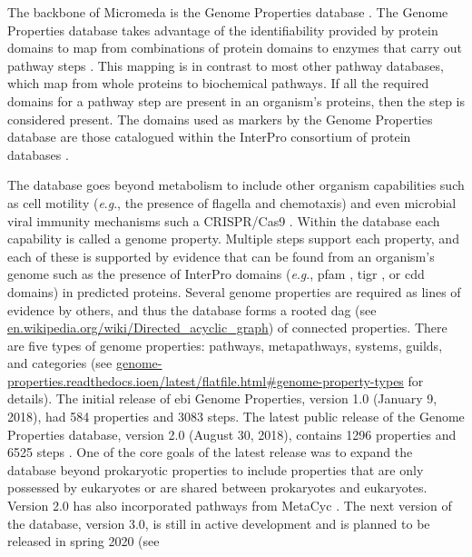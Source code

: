 The backbone of Micromeda is the Genome Properties database \cite{Haft2013}. 
The Genome Properties database takes advantage of the identifiability provided 
by protein domains to map from combinations of protein domains to enzymes that 
carry out pathway steps \cite{richardson2018genome}. This mapping is in 
contrast to most other pathway databases, which map from whole proteins to 
biochemical pathways. If all the required domains for a pathway step are present 
in an organism's proteins, then the step is considered present. The domains used 
as markers by the Genome Properties database are those catalogued within the 
InterPro consortium of protein databases 
\cite{apweiler2000interpro,richardson2018genome}. 

The database goes beyond metabolism to include other organism capabilities such as 
cell motility (\textit{e}.\textit{g}., the presence of flagella and chemotaxis) 
and even microbial viral immunity mechanisms such a CRISPR/Cas9 
\cite{horvath2010crispr}. Within the database each capability is called a genome 
property. Multiple steps support each property, and each of these is supported 
by evidence that can be found from an organism's genome such as the presence of 
InterPro domains (\textit{e}.\textit{g}., \gls{pfam} \cite{bateman2004pfam}, 
\gls{tigr} \cite{haft2001tigrfams}, or \gls{cdd} \cite{marchler2014cdd} domains) 
in predicted proteins. Several genome properties are required as lines of 
evidence by others, and thus the database forms a rooted \gls{dag} (see 
\href{http://en.wikipedia.org/wiki/Directed_acyclic_graph}{en.wikipedia.org/wiki/Directed\_acyclic\_graph}) 
of connected properties. There are five types of genome properties: pathways, 
metapathways, systems, guilds, and categories (see 
\href{http://genome-properties.readthedocs.io/en/latest/flatfile.html#genome-property-types}{genome-properties.readthedocs.ioen/latest/flatfile.html\#genome-property-types} 
for details). The initial release of \gls{ebi} Genome Properties, version 1.0 
(January 9, 2018), had 584 properties and 3083 steps. The latest public release 
of the Genome Properties database, version 2.0 (August 30, 2018), contains 1296 
properties and 6525 steps \cite{richardson2018genome}. One of the core goals of 
the latest release was to expand the database beyond prokaryotic properties to 
include properties that are only possessed by eukaryotes or are shared between 
prokaryotes and eukaryotes. Version 2.0 has also incorporated pathways from 
MetaCyc \cite{karp2002metacyc}. The next version of the database, version 3.0, 
is still in active development and is planned to be released in spring 2020 (see 
